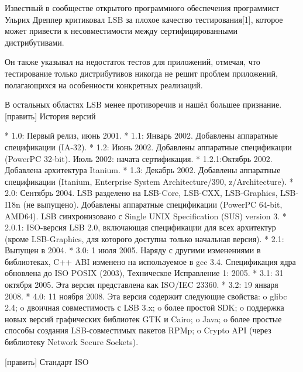 Известный в сообществе открытого программного обеспечения программист Ульрих Дреппер критиковал LSB за плохое качество тестирования[1], которое может привести к несовместимости между сертифицированными дистрибутивами.

Он также указывал на недостаток тестов для приложений, отмечая, что тестирование только дистрибутивов никогда не решит проблем приложений, полагающихся на особенности конкретных реализаций.

В остальных областях LSB менее противоречив и нашёл большее признание.
[править] История версий

    * 1.0: Первый релиз, июнь 2001.
    * 1.1: Январь 2002. Добавлены аппаратные спецификации (IA-32).
    * 1.2: Июнь 2002. Добавлены аппаратные спецификации (PowerPC 32-bit). Июль 2002: начата сертификация.
    * 1.2.1:Октябрь 2002. Добавлена архитектура Itanium.
    * 1.3: Декабрь 2002. Добавлены аппаратные спецификации (Itanium, Enterprise System Architecture/390, z/Architecture).
    * 2.0: Сентябрь 2004. LSB разделено на LSB-Core, LSB-CXX, LSB-Graphics, LSB-I18n (не выпущено). Добавлены аппаратные спецификации (PowerPC 64-bit, AMD64). LSB синхронизовано с Single UNIX Specification (SUS) version 3.
    * 2.0.1: ISO-версия LSB 2.0, включающая спецификации для всех архитектур (кроме LSB-Graphics, для которого доступна только начальная версия).
    * 2.1: Выпущен в 2004.
    * 3.0: 1 июля 2005. Наряду с другими изменениями в библиотеках, C++ ABI изменено на используемое в gcc 3.4. Спецификация ядра обновлена до ISO POSIX (2003), Техническое Исправление 1: 2005.
    * 3.1: 31 октября 2005. Эта версия представлена как ISO/IEC 23360.
    * 3.2: 19 января 2008.
    * 4.0: 11 ноября 2008. Эта версия содержит следующие свойства:
          o glibc 2.4;
          o двоичная совместимость с LSB 3.x;
          o более простой SDK;
          o поддержка новых версий графических библиотек GTK и Cairo;
          o Java;
          o более простые способы создания LSB-совместимых пакетов RPMp;
          o Crypto API (через библиотеку Network Secure Sockets).

[править] Стандарт ISO

